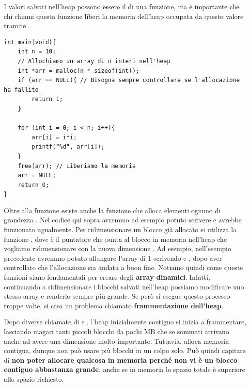 \documentclass[11pt, a4paper, titlepage, oneside]{scrbook}
\begin{document}
\NB I valori salvati nell'heap possono essere il  di una funzione, ma è importante che chi chiami questa funzione liberi la memoria dell'heap occupata da questo valore tramite .

\begin{lstlisting}[style=C]
int main(void){
    int n = 10;
    // Allochiamo un array di n interi nell'heap
    int *arr = malloc(n * sizeof(int));
    if (arr == NULL){ // Bisogna sempre controllare se l'allocazione ha fallito
        return 1;
    }

    for (int i = 0; i < n; i++){
        arr[i] = i*i;
        printf("%d", arr[i]);
    }
    free(arr); // Liberiamo la memoria
    arr = NULL;
    return 0;
}
\end{lstlisting}

Oltre alla funzione  esiste anche la funzione  che alloca  elementi ognuno di grandezza . Nel codice qui sopra avremmo ad esempio potuto scrivere  e avrebbe funzionato ugualmente. Per ridimensionare un blocco già allocato si utilizza la funzione , dove  è il puntatore che punta al blocco in memoria nell'heap che vogliamo ridimensionare con la nuova dimensione . Ad esempio, nell'esempio precedente avremmo potuto allungare l'array di 1 scrivendo  e , dopo aver controllato che l'allocazione sia andata a buon fine. Notiamo quindi come queste funzioni siano fondamentali per creare degli \textbf{array dinamici}. Infatti, continuando a ridimensionare i blocchi salvati nell'heap possiamo modificare uno stesso array e renderlo sempre più grande. Se però si esegue questo processo troppe volte, si crea un problema chiamato \textbf{frammentazione dell'heap}.

\begin{Proprieta}
\label{prop-frammentazione-heap}
Dopo diverse chiamate di  e , l'heap inizialmente contiguo si inizia a frammentare, lasciando magari tanti piccoli blocchi da pochi MB che se sommati arrivano anche ad avere una dimensione molto importante. Tuttavia,  alloca memoria contigua, dunque non può usare più blocchi in un colpo solo. Può quindi capitare di \textbf{non poter allocare qualcosa in memoria perché non vi è un blocco contiguo abbastanza grande}, anche se in memoria lo spazio totale è superiore allo spazio richiesto.
\end{Proprieta}
\end{document}
